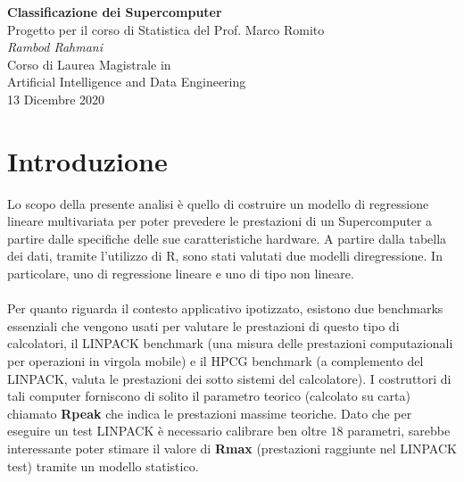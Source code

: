 \documentclass[11pt,a4paper]{article}
\begin{document}
\begin{center}
	\Large\textbf{Classificazione dei Supercomputer}\\
	\vspace{0.2cm}
	\large{Progetto per il corso di Statistica del Prof. Marco Romito}\\
	\vspace{0.5cm}
	\large\textit{Rambod Rahmani}\\
	\vspace{0.2cm}
	\scriptsize{Corso di Laurea Magistrale in\\Artificial Intelligence and
	Data Engineering}\\
	\vspace{0.5cm}
	\normalsize{13 Dicembre 2020}
\end{center}

\tableofcontents

\section{Introduzione}
Lo scopo della presente analisi \`e quello di costruire un modello di
regressione lineare multivariata per poter prevedere le prestazioni di un
Supercomputer a partire dalle specifiche delle sue caratteristiche hardware. A
partire dalla tabella dei dati, tramite l’utilizzo di R, sono stati valutati due
modelli diregressione. In particolare, uno di regressione lineare e uno di tipo
non lineare.\\
\\
Per quanto riguarda il contesto applicativo ipotizzato, esistono due benchmarks
essenziali che vengono usati per valutare le prestazioni di questo tipo di
calcolatori, il LINPACK benchmark (una misura delle prestazioni computazionali
per operazioni in virgola mobile) e il HPCG benchmark (a complemento del
LINPACK, valuta le prestazioni dei sotto sistemi del calcolatore). I costruttori
di tali computer forniscono di solito il parametro teorico (calcolato su carta)
chiamato \textbf{Rpeak} che indica le prestazioni massime teoriche. Dato che per
eseguire un test LINPACK \`e necessario calibrare ben oltre $18$ parametri,
sarebbe interessante poter stimare il valore di \textbf{Rmax} (prestazioni
raggiunte nel LINPACK test) tramite un modello statistico.
\end{document}

